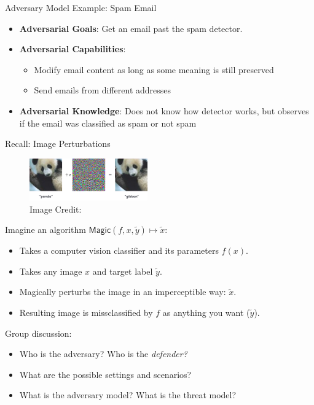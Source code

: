 \documentclass[10pt]{beamer}
\begin{document}
\begin{frame}[fragile]{Adversary Model Example: Spam Email}
  \begin{itemize}[<+->]
    \item \textbf{Adversarial Goals}: Get an email past the spam detector.
    \item \textbf{Adversarial Capabilities}:
        \begin{itemize}
            \item Modify email content as long as some meaning is still preserved
            \item Send emails from different addresses
        \end{itemize}
    \item \textbf{Adversarial Knowledge}: Does not know how detector works, but observes if the
        email was classified as spam or not spam
  \end{itemize}
\end{frame}


\begin{frame}{Recall: Image Perturbations}
  \begin{figure}
    \includegraphics[width=2in]{panda.png} \\
    \footnotesize Image Credit: \cite{GoodfellowSS14}
  \end{figure}

  Imagine an algorithm $\textsf{Magic}(f, x, \tilde y) \mapsto \tilde x$:
  \begin{itemize}
    \item Takes a computer vision classifier and its parameters $f(x)$.
    \item Takes any image $x$ and target label $\tilde y$.
    \item Magically perturbs the image in an imperceptible way: $\tilde x$.
    \item Resulting image is missclassified by $f$ as anything you want ($\tilde y$).
  \end{itemize}

  \begin{alertblock}{Group discussion:}
      \begin{itemize}[<+-| alert@+>]
          \item Who is the adversary? Who is the \emph{defender?}
          \item What are the possible settings and scenarios?
          \item What is the adversary model? What is the threat model?
      \end{itemize}
  \end{alertblock}

\end{frame}
\end{document}
